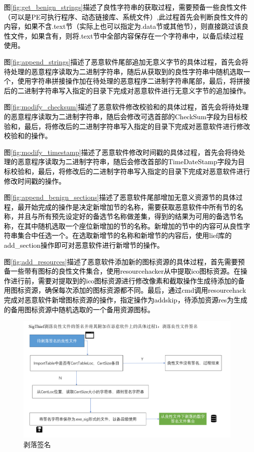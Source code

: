 \textcolor{black}{图\ref{fig:get_benign_strings}描述了良性字符串的获取过程，需要预备一些良性文件（可以是PE可执行程序、动态链接库、系统文件）,此过程首先会判断良性文件的内容，如果不含.text节（实际上也可以指定为.data节或其他节），则直接跳过该良性文件，如果含有，则将.text节中全部内容保存在一个字符串中，以备后续过程使用。}

\textcolor{black}{图\ref{fig:append_strings}描述了恶意软件尾部追加无意义字节的具体过程，首先会将待处理的恶意程序读取为二进制字符串，随后从获取到的良性字符串中随机选取一个，使用字符串拼接操作加在待处理的恶意程序二进制字符串尾部，最后，将拼接后的二进制字符串写入指定的目录下完成对恶意软件进行无意义字节的追加操作。}

\textcolor{black}{图\ref{fig:modify_checksum}描述了恶意软件修改校验和的具体过程，首先会将待处理的恶意程序读取为二进制字符串，随后会修改可选首部的CheckSum字段为目标校验和，最后，将修改后的二进制字符串写入指定的目录下完成对恶意软件进行修改校验和的操作。}

\textcolor{black}{图\ref{fig:modify_timestamp}描述了恶意软件修改时间戳的具体过程，首先会将待处理的恶意程序读取为二进制字符串，随后会修改首部的TimeDateStamp字段为目标校验和，最后，将修改后的二进制字符串写入指定的目录下完成对恶意软件进行修改时间戳的操作。}

\textcolor{black}{图\ref{fig:append_benign_sections}描述了恶意软件尾部增加无意义资源节的具体过程，最开始完成的操作是决定新增加节的名称，需要获取恶意软件中所有节的名称，并且与所有预先设定好的备选节名称做差集，得到的结果为可用的备选节名称，在其中随机选取一个座位新增加的节的名称。新增加的节中的内容可从良性字符串集合中任选一个。在选取新增节的名称和新增节的内容后，使用lief库的add\_section操作即可对恶意软件进行新增节的操作。}

\textcolor{black}{图\ref{fig:add_resources}描述了恶意软件添加新的图标资源的具体过程，首先需要预备一些带有图标的良性文件集合，使用resourcehacker从中提取ico图标资源。在操作进行前，需要对提取到的ico图标资源进行修改像素和截取操作生成待添加的备用图标资源，确保每次添加的图标资源都不同。最后，通过cmd调用resourcehack完成对恶意软件新增图标资源的操作，指定操作为addskip，待添加资源res为生成的备用图标资源中随机选取的一个备用资源图标。}

\begin{figure}
  \centering
  \includegraphics[]{images/peel_signature.png}
  \caption{剥落签名}\label{fig:peel_signature}
\end{figure}

